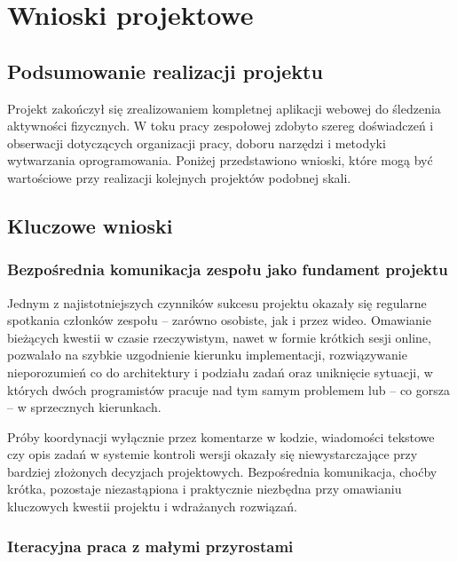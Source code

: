 \documentclass[12pt,a4paper]{report}
\begin{document}

\chapter{Wnioski projektowe}
\label{ch:wnioski}

\section{Podsumowanie realizacji projektu}

Projekt zakończył się zrealizowaniem kompletnej aplikacji webowej do śledzenia aktywności fizycznych. W toku pracy zespołowej zdobyto szereg doświadczeń i obserwacji dotyczących organizacji pracy, doboru narzędzi i metodyki wytwarzania oprogramowania. Poniżej przedstawiono wnioski, które mogą być wartościowe przy realizacji kolejnych projektów podobnej skali.

\section{Kluczowe wnioski}

\subsection{Bezpośrednia komunikacja zespołu jako fundament projektu}

Jednym z najistotniejszych czynników sukcesu projektu okazały się regularne spotkania członków zespołu -- zarówno osobiste, jak i przez wideo. Omawianie bieżących kwestii w czasie rzeczywistym, nawet w formie krótkich sesji online, pozwalało na szybkie uzgodnienie kierunku implementacji, rozwiązywanie nieporozumień co do architektury i podziału zadań oraz uniknięcie sytuacji, w których dwóch programistów pracuje nad tym samym problemem lub -- co gorsza -- w sprzecznych kierunkach.

Próby koordynacji wyłącznie przez komentarze w kodzie, wiadomości tekstowe czy opis zadań w systemie kontroli wersji okazały się niewystarczające przy bardziej złożonych decyzjach projektowych. Bezpośrednia komunikacja, choćby krótka, pozostaje niezastąpiona i praktycznie niezbędna przy omawianiu kluczowych kwestii projektu i wdrażanych rozwiązań.

\subsection{Iteracyjna praca z małymi przyrostami}
\end{document}
